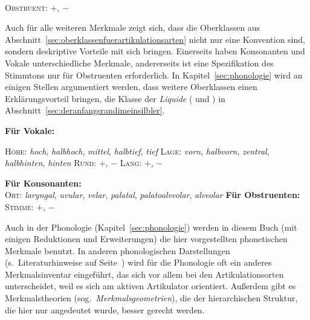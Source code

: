 \begin{exe}
  \\
    \textsc{Obstruent}: $+$, $-$
\end{exe}

Auch für alle weiteren Merkmale zeigt sich, dass die Oberklassen aus Abschnitt~\ref{sec:oberklassenfuerartikulationsarten} nicht nur eine Konvention sind, sondern deskriptive Vorteile mit sich bringen.
Einerseits haben Konsonanten und Vokale unterschiedliche Merkmale, andererseits ist eine Spezifikation des Stimmtons nur für Obstruenten erforderlich.
In Kapitel~\ref{sec:phonologie} wird an einigen Stellen argumentiert werden, dass weitere Oberklassen einen Erklärungsvorteil bringen, \zB die Klasse der \textit{Liquide} (\textipa{[K]} und \textipa{[l]}) in Abschnitt~\ref{sec:deranfangsrandimeinsilbler}.

\begin{exe}
  \ex \textbf{Für Vokale:}
    \begin{xlist}
      \ex \textsc{Höhe}: \textit{hoch}, \textit{halbhoch}, \textit{mittel}, \textit{halbtief}, \textit{tief}
      \ex \textsc{Lage}: \textit{vorn}, \textit{halbvorn}, \textit{zentral}, \textit{halbhinten}, \textit{hinten}
      \ex \textsc{Rund}: $+$, $-$
      \ex \textsc{Lang}: $+$, $-$
    \end{xlist}
  \ex \textbf{Für Konsonanten:}\\
      \textsc{Ort}: \textit{laryngal}, \textit{uvular}, \textit{velar}, \textit{palatal}, \textit{palatoalveolar}, \textit{alveolar}
  \ex \textbf{Für Obstruenten:}\\
    \textsc{Stimme}: $+$, $-$
\end{exe}

Auch in der Phonologie (Kapitel~\ref{sec:phonologie}) werden in diesem Buch (mit einigen Reduktionen und Erweiterungen) die hier vorgestellten phonetischen Merkmale benutzt.
In anderen phonologischen Darstellungen (s.\ Literaturhinweise auf Seite~\pageref{abs:001}) wird für die Phonologie oft ein anderes Merkmalsinventar eingeführt, das sich vor allem bei den Artikulationsorten unterscheidet, weil es sich am aktiven Artikulator orientiert.
Außerdem gibt es Merkmalstheorien (sog.\ \textit{Merkmalsgeometrien}), die der hierarchischen Struktur, die hier nur angedeutet wurde, besser gerecht werden.


